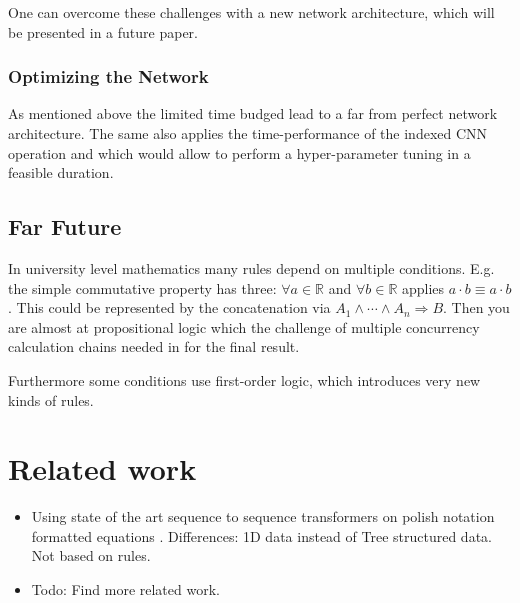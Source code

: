 \documentclass{scrartcl}
\theoremstyle{definition}
\begin{document}
One can overcome these challenges with a new network architecture, which will be presented in a future paper.

\subsubsection{Optimizing the Network}

As mentioned above the limited time budged lead to a far from perfect network architecture.
The same also applies the time-performance of the indexed CNN operation and which would allow to perform a hyper-parameter tuning in a feasible duration. 


\subsection{Far Future}

In university level mathematics many rules depend on multiple conditions.
E.g. the simple commutative property has three: $\forall a \in \mathbb{R}$ and $\forall b \in \mathbb{R}$ applies $a\cdot b \equiv a\cdot b$.
This could be represented by the concatenation via $A_1 \wedge \cdots \wedge A_n \Longrightarrow B$.
Then you are almost at propositional logic which the challenge of multiple concurrency calculation chains needed in for the final result.

Furthermore some conditions use first-order logic, which introduces very new kinds of rules.


\section{Related work}

\begin{itemize}
	\item Using state of the art sequence to sequence transformers on polish notation formatted equations \cite{Lample2020Deep}. Differences: 1D data instead of Tree structured data. Not based on rules. 
	\item Todo: Find more related work.
\end{itemize}

\printbibliography
\end{document}
